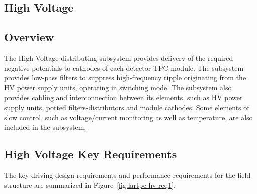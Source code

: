 
\subsection{High Voltage}
\label{sec:lartpc-des-hv}
\subsection{Overview}
The High Voltage distributing subsystem provides delivery of the required negative potentials to cathodes of 
each detector TPC module. The subsystem provides low-pass filters to suppress high-frequency ripple originating from the HV power supply units, operating in switching mode. The subsystem also provides cabling and interconnection between its elements, such as HV power supply units, potted filters-distributors and module cathodes. Some elements of slow control, such as voltage/current monitoring as well as temperature, are also included in the subsystem.
\subsection{High Voltage Key Requirements}

The key driving design requirements and performance requirements for the field structure are summarized in Figure~\ref{fig:lartpc-hv-req1}.

